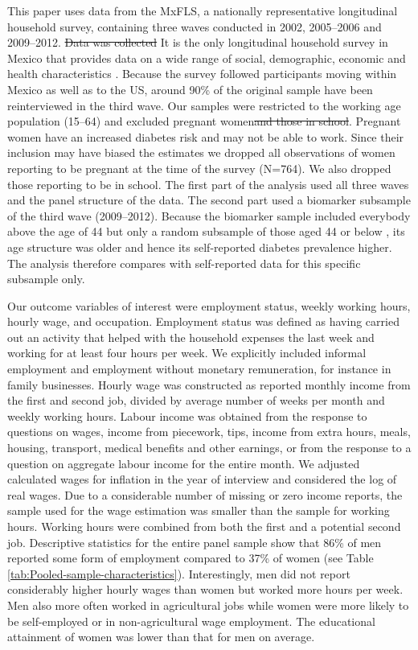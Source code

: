 \documentclass[12pt,english]{article}
\providecommand{\DIFaddtex}[1]{{\protect\color{blue}#1}} %
\providecommand{\DIFdeltex}[1]{{\protect\color{red}\sout{#1}}}                      %
\providecommand{\DIFaddbegin}{} %
\providecommand{\DIFaddend}{} %
\providecommand{\DIFdelbegin}{} %
\providecommand{\DIFdelend}{} %
\providecommand{\DIFadd}[1]{\texorpdfstring{\DIFaddtex{#1}}{#1}} %
\providecommand{\DIFdel}[1]{\texorpdfstring{\DIFdeltex{#1}}{}} %
\begin{document}
This paper uses data from the \acf{MxFLS}, a nationally representative longitudinal household survey, containing three waves conducted in 2002, 2005--2006 and 2009--2012. \DIFdelbegin \DIFdel{Data was collected }\DIFdelend \DIFaddbegin \DIFadd{It is the only longitudinal household survey in Mexico that provides data }\DIFaddend on a wide range of social, demographic, economic and health characteristics \parencite{Rubalcava2013}. \DIFaddbegin \DIFadd{Because the survey followed participants moving within Mexico as well as to the US, around 90\% of the original sample have been reinterviewed in the third wave. }\DIFaddend Our samples were restricted to the working age population (15--64) and excluded pregnant women\DIFdelbegin \DIFdel{and those in school}\DIFdelend . Pregnant women have an increased diabetes risk and may not be able to work. Since their inclusion may have biased the estimates we dropped all observations of women reporting to be pregnant at the time of the survey (N=764). \DIFaddbegin \DIFadd{We also dropped those reporting to be in school. }\DIFaddend The first part of the analysis used all three waves and the panel structure of the data. The second part used a biomarker subsample of the third wave (2009--2012). Because the biomarker sample included everybody above the age of 44 but only a random subsample of those aged 44 or below \parencite{Crimmins2015}, its age structure was older and hence its self-reported diabetes prevalence higher. The analysis therefore compares with self-reported data for this specific subsample only.

Our outcome variables of interest were employment status, weekly working hours, hourly wage, and occupation. Employment status was defined as having carried out an activity that helped with the household expenses the last week and working for at least four hours per week. We explicitly included informal employment and employment without monetary remuneration, for instance in family businesses.  Hourly wage was constructed as reported monthly income from the first and second job, divided by average number of weeks per month and weekly working hours.  Labour income was obtained from the response to questions on wages, income from piecework, tips, income from extra hours, meals, housing, transport, medical benefits and other earnings, or from the response to a question on aggregate labour income for the entire month. We adjusted calculated wages for inflation in the year of interview and considered the log of real wages. Due to a considerable number of missing or zero income reports, the sample used for the wage estimation was smaller than the sample for working hours. Working hours were combined from both the first and a potential second job. Descriptive statistics for the entire panel sample show that 86\% of men reported some form of employment compared to 37\% of women (see Table \ref{tab:Pooled-sample-characteristics}). Interestingly, men did not report considerably higher hourly wages than women but worked more hours per week. Men also more often worked in agricultural jobs while women were more likely to be self-employed or in non-agricultural wage employment. The educational attainment of women was lower than that for men on average.
\end{document}
